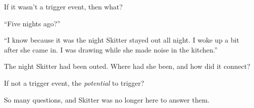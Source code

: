 If it wasn't a trigger event, then what?



``Five nights ago?''



``I know because it was the night Skitter stayed out all night.  I woke up a bit after she came in.  I was drawing while she made noise in the kitchen.''



The night Skitter had been outed.  Where had she been, and how did it connect?



If not a trigger event, the \emph{potential }to trigger?



So many questions, and Skitter was no longer here to answer them.





